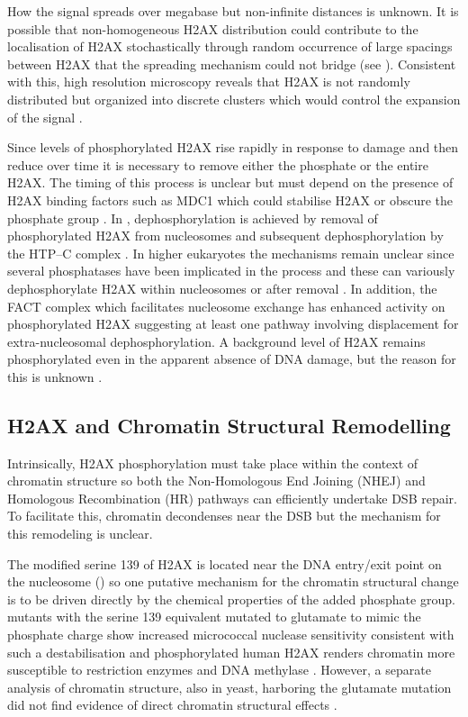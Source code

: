 How the signal spreads over megabase but non-infinite distances is unknown. It is possible that
non-homogeneous H2AX distribution could contribute to the localisation of \textgamma H2AX stochastically
through random occurrence of large spacings between H2AX that the spreading mechanism could not bridge
(see ). Consistent with this, high resolution microscopy reveals
that H2AX is not randomly distributed but organized into discrete clusters which would control the
expansion of the signal \citep{JBBTB06}.

Since levels of phosphorylated H2AX rise rapidly in response to damage and then reduce over time \citep{EPR+98}
it is necessary to remove either the phosphate or the entire \textgamma H2AX\@. The timing of this process
is unclear but must depend on the presence of \textgamma H2AX binding factors such as MDC1 which could
stabilise \textgamma H2AX or obscure the phosphate group \citep{MSJAC+05}. In ,
dephosphorylation is achieved by removal of phosphorylated H2AX from nucleosomes and subsequent
dephosphorylation by the HTP--C complex \citep{MKJK+06}. In higher eukaryotes the mechanisms remain
unclear since several phosphatases have been implicated in the process and these can variously
dephosphorylate H2AX within nucleosomes or after removal \citep{CKI+05,KTA+06,CXZ+08}. In addition,
the FACT complex which facilitates nucleosome exchange has enhanced activity on phosphorylated H2AX \citep{KHHK+08}
suggesting at least one pathway involving displacement for extra-nucleosomal dephosphorylation. A
background level of H2AX remains phosphorylated even in the apparent absence of DNA damage, but the
reason for this is unknown \citep{EPR+98}.

\subsection{\textgamma H2AX and Chromatin Structural Remodelling}
Intrinsically, H2AX phosphorylation must take place within the context of chromatin structure so
both the Non-Homologous End Joining (NHEJ) and Homologous Recombination (HR) pathways can efficiently
undertake DSB repair. To facilitate this, chromatin decondenses near the DSB \citep{MJK+06} but the
mechanism for this remodeling is unclear.

The modified serine 139 of H2AX is located near the DNA entry/exit point on the nucleosome
() so one putative mechanism for the chromatin structural change is to
be driven directly by the chemical properties of the added phosphate group. 
mutants with the serine 139 equivalent mutated to glutamate to mimic the phosphate charge show
increased micrococcal nuclease sensitivity consistent with such a destabilisation \citep{JAD00} and
phosphorylated human H2AX renders chromatin more susceptible to restriction enzymes and DNA
methylase \citep{KHHK+08}. However, a separate analysis of chromatin structure, also in yeast,
harboring the glutamate mutation did not find evidence of direct chromatin structural effects \citep{FIT07}.

